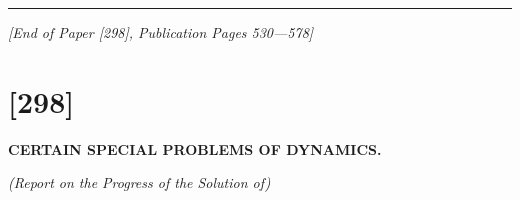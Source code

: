 \documentclass[11pt,a4paper]{book}
\begin{document}
\vspace{1cm}
\noindent\rule{\textwidth}{0.5pt}
\vspace{0.5cm}

\noindent\textit{[End of Paper [298], Publication Pages 530---578]}
\clearpage



\section*{[298]}

\begin{center}
\Large\bfseries CERTAIN SPECIAL PROBLEMS OF DYNAMICS.
\end{center}

\begin{center}
\textit{(Report on the Progress of the Solution of)}
\end{center}

\vspace{1em}
\end{document}
